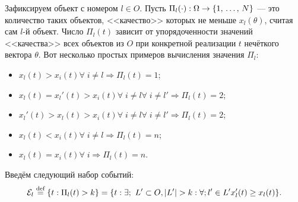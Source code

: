 Зафиксируем объект с номером $l \in O$. Пусть $\Pi_l(\cdot): \Omega \rightarrow \{1,\, \ldots,\, N\}$ --- это количество таких объектов, <<качество>> которых не меньше $x_l(\theta)$, считая сам $l$-й объект. Число $\Pi_l(t)$ зависит от упорядоченности значений <<качества>> всех объектов из $O$ при конкретной реализации $t$ нечёткого вектора $\theta$. Вот несколько простых примеров вычисления значения $\Pi_l$:
\begin{itemize}
  \item $x_l(t) > x_i(t) \forall\; i \neq l \Rightarrow \Pi_l(t) = 1$;
  \item $x_l(t) = x_l'(t) > x_i(t) \forall\; i \neq l \forall\; i \neq l' \Rightarrow \Pi_l(t) = 2$;
  \item $x_l'(t) > x_l(t) > x_i(t) \forall\; i \neq l \forall\; i \neq l' \Rightarrow \Pi_l(t) = 2$;
  \item $x_l(t) < x_i(t) \forall\; i \neq l \Rightarrow \Pi_l(t) = n$;
  \item $x_l(t) = x_i(t) \forall\; i \Rightarrow \Pi_l(t) = n$.
\end{itemize}

Введём следующий набор событий:
\begin{equation}
  \label{e:Eps_l_def}
  \mathcal{E}_l \overset{\text{def}}{=} \{t: \Pi_l(t) > k\} = \{t: \exists;\ L' \subset O, \left| L' \right| > k: \forall; l' \in L' x_l'(t) \geq x_{l}(t)\}.
\end{equation}

